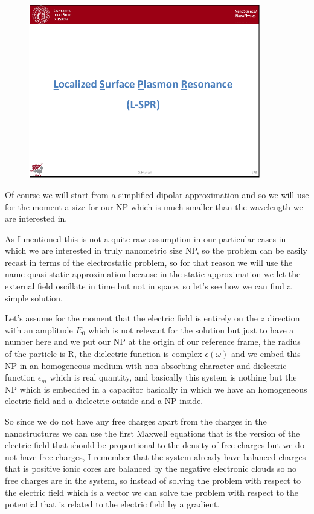 \documentclass[../main/main.tex]{subfiles}
\begin{document}
\begin{figure}[h!]
\centering
\includegraphics[page=13,width=0.9\textwidth]{../lessons/pdf_file/11_lesson.pdf}
\end{figure}

Of course we will start from a simplified dipolar approximation and so we will use for the moment a size for our NP which is much smaller than the wavelength we are interested in.

As I mentioned this is not a quite raw assumption in our particular cases in which we are interested in truly nanometric size NP, so the problem can be easily recast in terms of the electrostatic problem, so for that reason we will use the name quasi-static approximation because in the static approximation we let the external field oscillate in time but not in space, so let's see how we can find a simple solution. 

Let's assume for the moment that the electric field is entirely on the $z$ direction with an amplitude $E_0$ which is not relevant for the solution but just to have a number here and we put our NP at the origin of our reference frame, the radius of the particle is R, the dielectric function is complex $\epsilon(\omega)$ and we embed this NP in an homogeneous medium with non absorbing character and dielectric function $\epsilon_m$ which is real quantity, and basically this system is nothing but the NP which is embedded in a capacitor basically in which we have an homogeneous electric field and a dielectric outside and a NP inside.

So since we do not have any free charges apart from the charges in the nanostructures we can use the first Maxwell equations that is the version of the electric field that should be proportional to the density of free charges but we do not have free charges, I remember that the system already have balanced charges that is positive ionic cores are balanced by the negative electronic clouds so no free charges are in the system, so instead of solving the problem with respect to the electric field which is a vector we can solve the problem with respect to the potential that is related to the electric field by a gradient.
\end{document}

